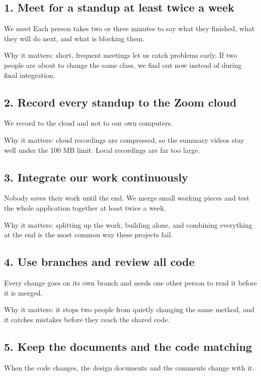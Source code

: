 \documentclass[11pt]{article}
\newcommand{\norm}[1]{\subsection*{#1}}
\begin{document}
\norm{1. Meet for a standup at least twice a week}
We meet 
 Each person takes two or three minutes to say what
they finished, what they will do next, and what is blocking them.

Why it matters: short, frequent meetings let us catch problems early. If two people are about
to change the same class, we find out now instead of during final integration.

\norm{2. Record every standup to the Zoom cloud}
We record to the cloud and not to our own computers.

Why it matters: cloud recordings are compressed, so the summary videos stay well under the
100 MB limit. Local recordings are far too large.
\unchanged

\norm{3. Integrate our work continuously}
Nobody saves their work until the end. We merge small working pieces and test the whole
application together at least twice a week.

Why it matters: splitting up the work, building alone, and combining everything at the end is
the most common way these projects fail.

\norm{4. Use branches and review all code}
Every change goes on its own branch and needs one other person to read it before it is merged.

Why it matters: it stops two people from quietly changing the same method, and it catches
mistakes before they reach the shared code.
\unchanged

\norm{5. Keep the documents and the code matching}
When the code changes, the design documents and the comments change with it.
\end{document}
